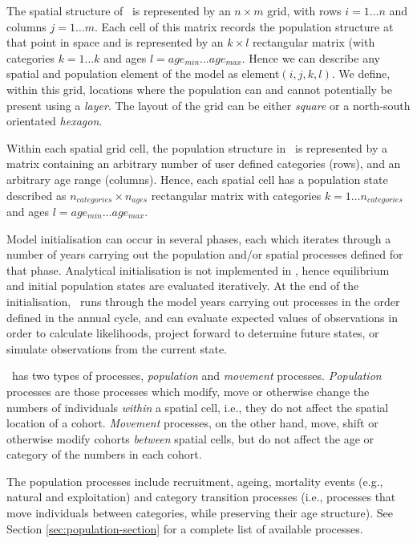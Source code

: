 The spatial structure of \SPM\ is represented by an $n \times m$ grid, with rows $i=1 \dots n$ and columns $j=1 \ldots m$. Each cell of this matrix records the population structure at that point in space and is represented by an $k \times l$ rectangular matrix (with categories $k=1 \ldots k$ and ages $l=age_{min} \ldots age_{max}$. Hence we can describe any spatial and population element of the model as element$(i,j,k,l)$. We define, within this grid, locations where the population can and cannot potentially be present using a \emph{layer}. The layout of the grid can be either \emph{square} or a north-south orientated \emph{hexagon}.

Within each spatial grid cell, the population structure in \SPM\ is represented by a matrix containing an arbitrary number of user defined categories (rows), and an arbitrary age range (columns). Hence, each spatial cell has a population state described as $n_{categories} \times n_{ages}$ rectangular matrix with categories $k=1 \ldots n_{categories}$ and ages $l=age_{min} \ldots age_{max}$. 

Model initialisation can occur in several phases, each which iterates through a number of years carrying out the population and/or spatial processes defined for that phase. Analytical initialisation is not implemented in \SPM, hence equilibrium and initial population states are evaluated iteratively. At the end of the initialisation, \SPM\ runs through the model years carrying out processes in the order defined in the annual cycle, and can evaluate expected values of observations in order to calculate likelihoods, project forward to determine future states, or simulate observations from the current state.

\SPM\ has two types of processes, \emph{population} and \emph{movement} processes. \emph{Population} processes are those processes which modify, move or otherwise change the numbers of individuals \emph{within} a spatial cell, i.e., they do not affect the spatial location of a cohort. \emph{Movement} processes, on the other hand, move, shift or otherwise modify cohorts \emph{between} spatial cells, but do not affect the age or category of the numbers in each cohort. 

The population processes include recruitment, ageing,  mortality events (e.g., natural and exploitation) and category transition processes (i.e., processes that move individuals between categories, while preserving their age structure). See Section \ref{sec:population-section} for a complete list of available processes.

